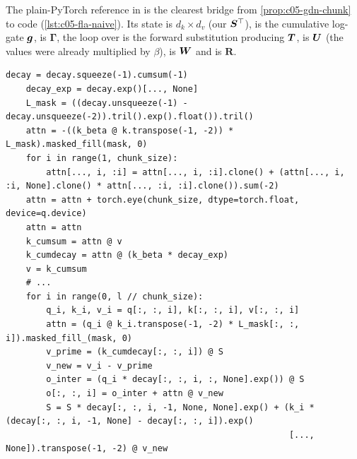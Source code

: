 \begin{sloppypar}
The plain-PyTorch reference  in
 is the clearest
bridge from \cref{prop:c05-gdn-chunk} to code (\cref{lst:c05-fla-naive}). Its state  is
$d_k\times d_v$ (our $\bm{S}^{\top}$),  is the cumulative log-gate $\bm{g}$,  is
$\bm\Gamma$, the loop over  is the forward substitution producing $\bm{T}$, 
is $\bm{U}$ (the values were already multiplied by $\beta$),  is $\bm{W}$ and
 is $\bm R$.
\end{sloppypar}

\begin{lstlisting}[caption={Excerpt from \texttt{repos/\allowbreak{}fla-org\_\_flash-linear-attention/\allowbreak{}fla/\allowbreak{}ops/\allowbreak{}gated\_delta\_rule/\allowbreak{}naive.py}, function \texttt{naive\_chunk\_gated\_delta\_rule}},label={lst:c05-fla-naive}]
    decay = decay.squeeze(-1).cumsum(-1)
    decay_exp = decay.exp()[..., None]
    L_mask = ((decay.unsqueeze(-1) - decay.unsqueeze(-2)).tril().exp().float()).tril()
    attn = -((k_beta @ k.transpose(-1, -2)) * L_mask).masked_fill(mask, 0)
    for i in range(1, chunk_size):
        attn[..., i, :i] = attn[..., i, :i].clone() + (attn[..., i, :i, None].clone() * attn[..., :i, :i].clone()).sum(-2)
    attn = attn + torch.eye(chunk_size, dtype=torch.float, device=q.device)
    attn = attn
    k_cumsum = attn @ v
    k_cumdecay = attn @ (k_beta * decay_exp)
    v = k_cumsum
    # ...
    for i in range(0, l // chunk_size):
        q_i, k_i, v_i = q[:, :, i], k[:, :, i], v[:, :, i]
        attn = (q_i @ k_i.transpose(-1, -2) * L_mask[:, :, i]).masked_fill_(mask, 0)
        v_prime = (k_cumdecay[:, :, i]) @ S
        v_new = v_i - v_prime
        o_inter = (q_i * decay[:, :, i, :, None].exp()) @ S
        o[:, :, i] = o_inter + attn @ v_new
        S = S * decay[:, :, i, -1, None, None].exp() + (k_i * (decay[:, :, i, -1, None] - decay[:, :, i]).exp()
                                                        [..., None]).transpose(-1, -2) @ v_new
\end{lstlisting}

